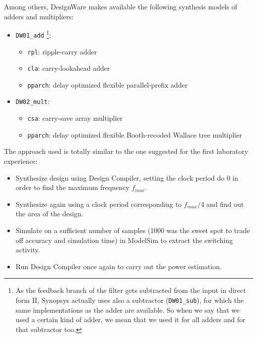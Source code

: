 \documentclass[a4paper]{article}
\begin{document}
Among others, DesignWare makes available the following synthesis models of adders and multipliers:
\begin{itemize}
	\item \texttt{DW01\_add} \footnote{As the feedback branch of the filter gets subtracted from the input in direct form II, Synopsys actually uses also a subtractor (\texttt{DW01\_sub}), for which the same implementations as the adder are available. So when we say that we used a certain kind of adder, we mean that we used it for all adders and for that subtractor too.}:
	\begin{itemize}
		\item \texttt{rpl}: ripple-carry adder
		\item \texttt{cla}: carry-lookahead adder
		\item \texttt{pparch}: delay optimized flexible parallel-prefix adder
	\end{itemize}
	\item \texttt{DW02\_mult}:
	\begin{itemize}
		\item \texttt{csa}: carry-save array multiplier
		\item \texttt{pparch}: delay optimized flexible Booth-recoded Wallace tree multiplier
	\end{itemize}
\end{itemize}

The approach used is totally similar to the one suggested for the first laboratory experience:
\begin{itemize}
	\item Synthesize design using Design Compiler, setting the clock period do 0 in order to find the maximum frequency $f_{max}$.
	\item Synthesize again using a clock period corresponding to $f_{max}/4$ and find out the area of the design.
	\item Simulate on a sufficient number of samples (1000 was the sweet spot to trade off accuracy and simulation time) in ModelSim to extract the switching activity.
	\item Run Design Compiler once again to carry out the power estimation.
\end{itemize}
\end{document}
